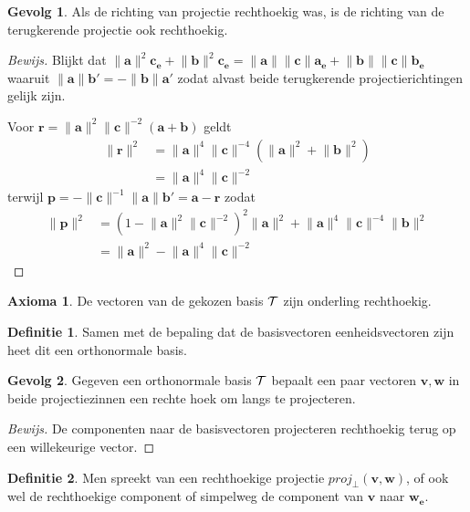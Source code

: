 \documentclass{amsart}
\theoremstyle{definition}
\newtheorem{axm}{Axioma}[section]
\newtheorem{dfn}{Definitie}[section]
\newtheorem{csq}{Gevolg}[section]
\newenvironment{bewijs}{\begin{proof}[Bewijs]}{\end{proof}}
\newcommand{\norm}[1]{\lVert{#1}\rVert}
\newcommand{\vvec}[1][v]{\mathbf{#1}}
\newcommand{\uvec}[1][v]{\vvec[#1]_\mathbf{e}}
\newcommand{\vnorm}[1]{\norm{\vvec[#1]}}
\newcommand{\vecrow}[1][a]{\mathcal{\MakeUppercase{#1}}}
\begin{document}
\begin{csq}
	Als de richting van projectie rechthoekig was, is de richting van de terugkerende projectie ook rechthoekig.
	\begin{bewijs}
		Blijkt dat $\vnorm a^2\uvec[c] + \vnorm b^2\uvec[c] = \vnorm a\vnorm c\uvec[a] + \vnorm b\vnorm c\uvec[b]$ waaruit $\vnorm a\vvec[b'] = -\vnorm b\vvec[a']$ zodat alvast beide terugkerende projectierichtingen gelijk zijn.
		
		Voor $\vvec[r] = \vnorm a^2\vnorm c^{-2}(\vvec[a]+\vvec[b])$ geldt
		\begin{align*}
			\vnorm r^2 
			&= \vnorm a^4\vnorm c^{-4}\left(\vnorm a^2 + \vnorm b^2\right)\\
			&= \vnorm a^4\vnorm c^{-2}
		\end{align*}
		terwijl $\vvec[p] = -\vnorm c^{-1}\vnorm a\vvec[b'] = \vvec[a] - \vvec[r]$ zodat 
		\begin{align*}
			\vnorm p^2 
			&= (1 - \vnorm a^2\vnorm c^{-2})^2\vnorm a^2 + \vnorm a^4\vnorm c^{-4}\vnorm b^2\\
			&= \vnorm a^2 - \vnorm a^4\vnorm c^{-2}
		\end{align*}
	\end{bewijs}
\end{csq}

\begin{axm}
	De vectoren van de gekozen basis $\vecrow[t]$ zijn onderling rechthoekig.
\end{axm}

\begin{dfn}
	Samen met de bepaling dat de basisvectoren eenheidsvectoren zijn heet dit een orthonormale basis.
\end{dfn}

\begin{csq}
	Gegeven een orthonormale basis $\vecrow[t]$ bepaalt een paar vectoren $\vvec, \vvec[w]$ in beide projectiezinnen een rechte hoek om langs te projecteren.
	\begin{bewijs}
		De componenten naar de basisvectoren projecteren rechthoekig terug op een willekeurige vector.
	\end{bewijs}
\end{csq}

\begin{dfn}
	Men spreekt van een rechthoekige projectie $proj_\perp(\vvec, \vvec[w])$, of ook wel de rechthoekige component of simpelweg de component van $\vvec$ naar $\uvec[w]$.
\end{dfn}
\end{document}
